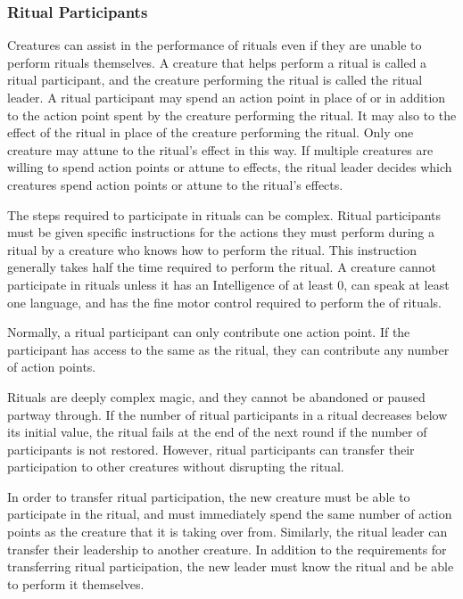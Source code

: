         \subsubsection{Ritual Participants}
            Creatures can assist in the performance of rituals even if they are unable to perform rituals themselves.
            A creature that helps perform a ritual is called a ritual participant, and the creature performing the ritual is called the ritual leader.
            A ritual participant may spend an action point in place of or in addition to the action point spent by the creature performing the ritual.
            It may also  to the effect of the ritual in place of the creature performing the ritual.
            Only one creature may attune to the ritual's effect in this way.
            If multiple creatures are willing to spend action points or attune to effects, the ritual leader decides which creatures spend action points or attune to the ritual's effects.

            The steps required to participate in rituals can be complex.
            Ritual participants must be given specific instructions for the actions they must perform during a ritual by a creature who knows how to perform the ritual.
            This instruction generally takes half the time required to perform the ritual.
            A creature cannot participate in rituals unless it has an Intelligence of at least 0, can speak at least one language, and has the fine motor control required to perform the  of rituals.

            Normally, a ritual participant can only contribute one action point.
            If the participant has access to the same  as the ritual, they can contribute any number of action points.

            Rituals are deeply complex magic, and they cannot be abandoned or paused partway through.
            If the number of ritual participants in a ritual decreases below its initial value, the ritual fails at the end of the next round if the number of participants is not restored.
            However, ritual participants can transfer their participation to other creatures without disrupting the ritual.

            In order to transfer ritual participation, the new creature must be able to participate in the ritual, and must immediately spend the same number of action points as the creature that it is taking over from.
            Similarly, the ritual leader can transfer their leadership to another creature.
            In addition to the requirements for transferring ritual participation, the new leader must know the ritual and be able to perform it themselves.


